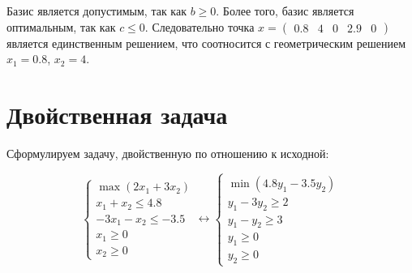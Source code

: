 Базис является допустимым, так как $b \ge 0$. Более того, базис является оптимальным, так как $c \le 0$. Следовательно точка $x = \begin{pmatrix} 0.8 & 4 & 0 & 2.9 & 0 \end{pmatrix}$ является единственным решением, что соотносится с геометрическим решением $x_1 = 0.8$, $x_2 = 4$.

\section{Двойственная задача}

Сформулируем задачу, двойственную по отношению к исходной:

\begin{equation*}
\begin{cases}
	\max \left( 2 x_1 + 3 x_2 \right) \\
	x_1 + x_2 \le 4.8 \\
	-3 x_1 - x_2 \le -3.5 \\
	x_1 \ge 0 \\
	x_2 \ge 0
\end{cases}
\longleftrightarrow
\begin{cases}
	\min \left( 4.8 y_1 - 3.5 y_2 \right) \\
	y_1 - 3y_2 \ge 2 \\
	y_1 - y_2 \ge 3 \\
	y_1 \ge 0 \\
	y_2 \ge 0
\end{cases}
\end{equation*}


